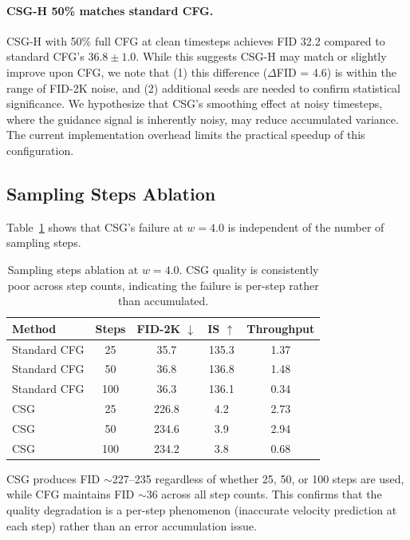 \documentclass{article}
\begin{document}
\paragraph{CSG-H 50\% matches standard CFG.}
CSG-H with 50\% full CFG at clean timesteps achieves FID 32.2 compared to standard CFG's $36.8 \pm 1.0$. While this suggests CSG-H may match or slightly improve upon CFG, we note that (1) this difference ($\Delta$FID = 4.6) is within the range of FID-2K noise, and (2) additional seeds are needed to confirm statistical significance. We hypothesize that CSG's smoothing effect at noisy timesteps, where the guidance signal is inherently noisy, may reduce accumulated variance. The current implementation overhead limits the practical speedup of this configuration.

\subsection{Sampling Steps Ablation}

Table~\ref{tab:steps} shows that CSG's failure at $w = 4.0$ is independent of the number of sampling steps.

\begin{table}[t]
\caption{Sampling steps ablation at $w = 4.0$. CSG quality is consistently poor across step counts, indicating the failure is per-step rather than accumulated.}
\label{tab:steps}
\centering\small
\begin{tabular}{lcccc}
\toprule
Method & Steps & FID-2K $\downarrow$ & IS $\uparrow$ & Throughput \\
\midrule
Standard CFG & 25 & 35.7 & 135.3 & 1.37 \\
Standard CFG & 50 & 36.8 & 136.8 & 1.48 \\
Standard CFG & 100 & 36.3 & 136.1 & 0.34 \\
\midrule
CSG & 25 & 226.8 & 4.2 & 2.73 \\
CSG & 50 & 234.6 & 3.9 & 2.94 \\
CSG & 100 & 234.2 & 3.8 & 0.68 \\
\bottomrule
\end{tabular}
\end{table}

CSG produces FID $\sim$227--235 regardless of whether 25, 50, or 100 steps are used, while CFG maintains FID $\sim$36 across all step counts. This confirms that the quality degradation is a per-step phenomenon (inaccurate velocity prediction at each step) rather than an error accumulation issue.
\end{document}
